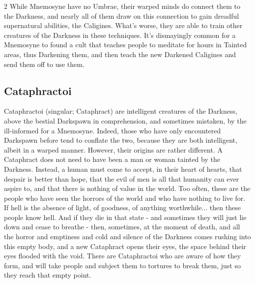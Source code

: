 \begin{multicols}{2}
While Mnemosyne have no Umbrae, their warped minds do connect them to the Darkness, and nearly all of them draw on this connection to gain dreadful supernatural abilities, the Caligines. What's worse, they are able to train other creatures of the Darkness in these techniques. It's dismayingly common for a Mnemosyne to found a cult that teaches people to meditate for hours in Tainted areas, thus Darkening them, and then teach the new Darkened Caligines and send them off to use them. 

\subsection*{Cataphractoi}
Cataphractoi (singular; Cataphract) are intelligent creatures of the Darkness, above the bestial Darkspawn in comprehension, and sometimes mistaken, by the ill-informed for a Mnemosyne. Indeed, those who have only encountered Darkspawn before tend to conflate the two, because they are both intelligent, albeit in a warped manner. However, their origins are rather different. A Cataphract does not need to have been a man or woman tainted by the Darkness. Instead, a human must come to accept, in their heart of hearts, that despair is better than hope, that the evil of men is all that humanity can ever aspire to, and that there is nothing of value in the world. Too often, these are the people who have seen the horrors of the world and who have nothing to live for. If hell is the absence of light, of goodness, of anything worthwhile... then these people know hell. And if they die in that state - and sometimes they will just lie down and cease to breathe - then, sometimes, at the moment of death, 
and all the horror and emptiness and cold and silence of the Darkness comes rushing into this empty body, and a new Cataphract opens their eyes, the space behind their eyes flooded with the void. There are Cataphractoi who are aware of how they form, and will take people and subject them to tortures to break them, just so they reach that empty point.


\end{multicols}
